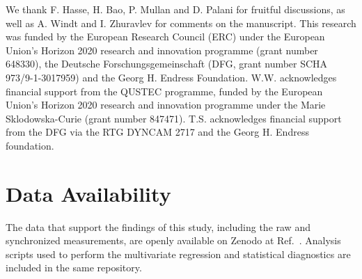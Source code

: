 \documentclass[aps,prapplied,reprint,groupedaddress,twocolumn,superscriptaddress,linenumbers]{revtex4-2}
\begin{document}
\begin{acknowledgments}
We thank F. Hasse, H. Bao, P. Mullan and D. Palani for fruitful discussions, as well as A. Windt and I. Zhuravlev for comments on the manuscript. This research was funded by the European Research Council (ERC) under the European Union's Horizon 2020 research and innovation programme (grant number 648330), the Deutsche Forschungsgemeinschaft (DFG, grant number SCHA 973/9-1-3017959) and the Georg H. Endress Foundation. W.W. acknowledges financial support from the QUSTEC programme, funded by the European Union's Horizon 2020 research and innovation programme under the Marie Sklodowska-Curie (grant number 847471). T.S. acknowledges financial support from the DFG via the RTG DYNCAM 2717 and the Georg H. Endress foundation.
\end{acknowledgments}

\section*{Data Availability}
The data that support the findings of this study, including the raw and synchronized measurements, are openly available on Zenodo at Ref.~\cite{wu_2026_18800166}. Analysis scripts used to perform the multivariate regression and statistical diagnostics are included in the same repository.


\end{document}

